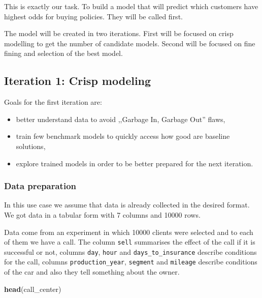 \documentclass[12pt,]{krantz}
\newenvironment{Shaded}{\begin{snugshade}}{\end{snugshade}}
\newcommand{\KeywordTok}[1]{\textcolor[rgb]{0.13,0.29,0.53}{\textbf{#1}}}
\newcommand{\NormalTok}[1]{#1}
\providecommand{\tightlist}{%
  \setlength{\itemsep}{0pt}\setlength{\parskip}{0pt}}
\begin{document}
This is exactly our task. To build a model that will predict which customers have highest odds for buying policies. They will be called first.

The model will be created in two iterations. First will be focused on crisp modelling to get the number of candidate models. Second will be focused on fine fining and selection of the best model.

\hypertarget{iteration-1-crisp-modeling}{%
\subsection{Iteration 1: Crisp modeling}\label{iteration-1-crisp-modeling}}

Goals for the first iteration are:

\begin{itemize}
\tightlist
\item
  better understand data to avoid ,,Garbage In, Garbage Out'' flaws,
\item
  train few benchmark models to quickly access how good are baseline solutions,
\item
  explore trained models in order to be better prepared for the next iteration.
\end{itemize}

\hypertarget{data-preparation-2}{%
\subsubsection{Data preparation}\label{data-preparation-2}}

In this use case we assume that data is already collected in the desired format.
We got data in a tabular form with 7 columns and 10000 rows.

Data come from an experiment in which 10000 clients were selected and to each of them we have a call. The column \texttt{sell} summarises the effect of the call if it is successful or not, columns \texttt{day}, \texttt{hour} and \texttt{days\_to\_insurance} describe conditions for the call, columns \texttt{production\_year}, \texttt{segment} and \texttt{mileage} describe conditions of the car and also they tell something about the owner.

\begin{Shaded}
\begin{Highlighting}[]
\KeywordTok{head}\NormalTok{(call_center)}
\end{Highlighting}
\end{Shaded}
\end{document}
